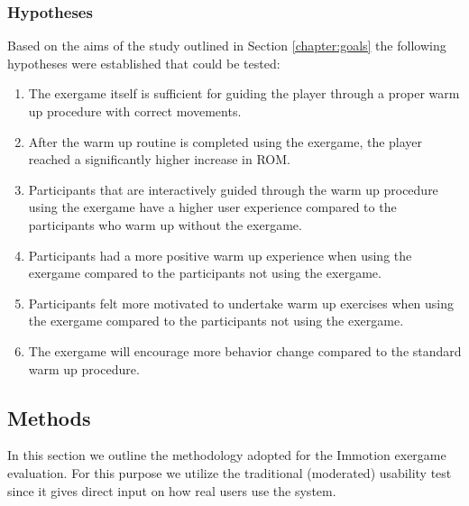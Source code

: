 \subsubsection{Hypotheses}
Based on the aims of the study outlined in Section  \ref{chapter:goals} the following hypotheses were established that could be tested: 
\begin{enumerate}
\item The exergame itself is sufficient for guiding the player through a proper warm up procedure with correct movements. 
\item After the warm up routine is completed using the exergame, the player reached a significantly higher increase in ROM.
\item Participants that are interactively guided through the warm up procedure using the exergame have a higher user experience compared to the participants who warm up without the exergame.
\item Participants had a more positive warm up experience when using the exergame compared to the participants not using the exergame.  
\item Participants felt more motivated to undertake warm up exercises when using the 
exergame compared to the participants not using the exergame.
\item The exergame will encourage more 
behavior change compared to the standard warm up procedure. 
\end{enumerate}

\subsection{Methods} 
In this section we outline the methodology adopted for the Immotion exergame evaluation. For this purpose we utilize the traditional (moderated) usability test since it gives direct input on how real users use the system. %
%
